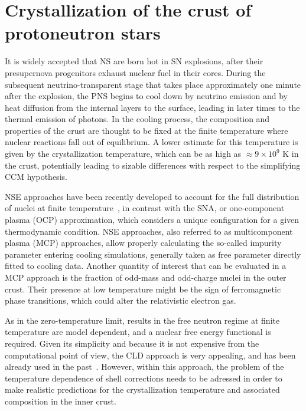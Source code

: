 \chapter{Crystallization of the crust of protoneutron stars}

It is widely accepted that NS are born hot in SN 
explosions, after their presupernova progenitors exhaust nuclear fuel in their
cores. During the subsequent neutrino-transparent stage that takes place 
approximately one minute after the explosion, the PNS 
begins to cool down by neutrino emission and by heat diffusion from the 
internal layers to the surface, leading in later times to the thermal emission 
of photons.
In the cooling process, the composition and properties of the crust are thought 
to be fixed at the finite temperature where nuclear reactions fall out of 
equilibrium. A lower estimate for this temperature is given by the 
crystallization temperature, which can be as high as $\approx 9\times 10^9$ K
in the crust, potentially leading to sizable differences with respect to
the simplifying CCM hypothesis.

NSE approaches have been recently developed 
to account for the full distribution of nuclei at finite 
temperature~\cite{Gulminelli2015}, in contrast with the SNA, or one-component
plasma (OCP) approximation, which considers a unique 
configuration for a given thermodynamic condition. NSE approaches, also 
referred to as multicomponent plasma (MCP) approaches, allow properly 
calculating the so-called impurity parameter entering cooling simulations, 
generally taken as free parameter directly fitted to cooling data. 
Another quantity of interest that can be evaluated in a MCP approach is the 
fraction of odd-mass and odd-charge nuclei in the outer crust. Their presence 
at low temperature might be the sign of ferromagnetic phase transitions, which 
could alter the relativistic electron gas.

As in the zero-temperature limit, results in the free neutron regime at
finite temperature are model dependent, and a nuclear free energy
functional is required. Given its simplicity and because it is not expensive
from the computational point of view, the CLD approach is very appealing, and 
has been already used in the past~\cite{Gulminelli2015,Grams2018}. However,
within this approach, the problem of the temperature dependence of shell 
corrections needs to be adressed in order to make realistic predictions for the 
crystallization temperature and associated composition in the inner crust.

